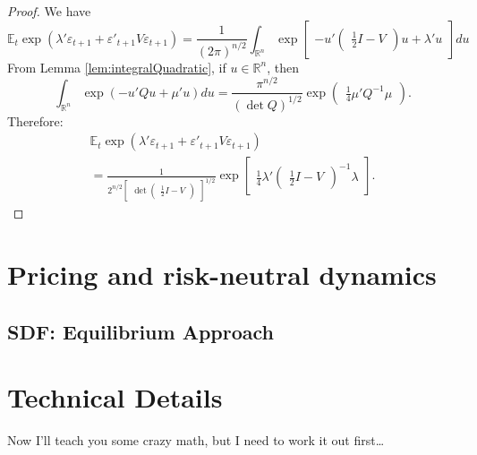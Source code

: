 \documentclass[
  12pt,
]{book}
\theoremstyle{definition}
\theoremstyle{definition}
\theoremstyle{definition}
\theoremstyle{definition}
\theoremstyle{remark}
\begin{document}
\begin{proof}
We have
\[
\mathbb{E}_t   \exp(\lambda'\varepsilon_{t+1}+\varepsilon'_{t+1}V\varepsilon_{t+1})
=  \frac{1}{(2\pi)^{n/2}}  \int_{\mathbb{R}^{n}} \exp\left[
\begin{array}{l}
-u'\left(
\begin{array}{l}
 \frac{1}{2} I-V
\end{array}
\right)u+\lambda'u
\end{array}
\right]du
\]
From Lemma \ref{lem:integralQuadratic}, if \(u\in\mathbb{R}^n\), then
\[
\int_{\mathbb{R}^{n}} \exp(-u' Q u+\mu'u) du =
 \frac{\pi^{n/2}}{(\det Q)^{1/2}} \exp\left(
\begin{array}{l}
 \frac{1}{4} \mu'Q^{-1}\mu
\end{array}
\right).
\]
Therefore:
\[
\begin{array}{l}
\mathbb{E}_t   \exp(\lambda'\varepsilon_{t+1}+\varepsilon'_{t+1}V\varepsilon_{t+1}) \\
=  \frac{1}{2^{n/2}
\left[
\begin{array}{l}
\det \left(
\begin{array}{l}
 \frac{1}{2} I-V
\end{array}
\right)
\end{array}
\right]^{1/2}
}
\exp\left[
\begin{array}{l}
   \frac{1}{4}  \lambda'\left(
\begin{array}{l}
 \frac{1}{2} I-V
\end{array}
\right)^{-1}\lambda
\end{array}
\right].
\end{array}
\]
\end{proof}

\hypertarget{pricing-and-risk-neutral-dynamics}{%
\chapter{Pricing and risk-neutral dynamics}\label{pricing-and-risk-neutral-dynamics}}

\hypertarget{PricingEquilibrium}{%
\section{SDF: Equilibrium Approach}\label{PricingEquilibrium}}

\hypertarget{technical-details}{%
\chapter{Technical Details}\label{technical-details}}

Now I'll teach you some crazy math, but I need to work it out first\ldots{}

  
\end{document}
